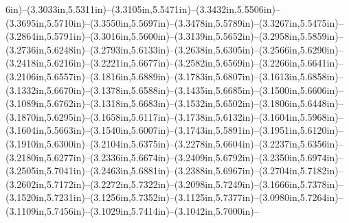 6in)--(3.3033in,5.5311in)--(3.3105in,5.5471in)--(3.3432in,5.5506in)--(3.3695in,5.5710in)--(3.3550in,5.5697in)--(3.3478in,5.5789in)--(3.3267in,5.5475in)--(3.2864in,5.5791in)--(3.3016in,5.5600in)--(3.3139in,5.5652in)--(3.2958in,5.5859in)--(3.2736in,5.6248in)--(3.2793in,5.6133in)--(3.2638in,5.6305in)--(3.2566in,5.6290in)--(3.2418in,5.6216in)--(3.2221in,5.6677in)--(3.2582in,5.6569in)--(3.2266in,5.6641in)--(3.2106in,5.6557in)--(3.1816in,5.6889in)--(3.1783in,5.6807in)--(3.1613in,5.6858in)--(3.1332in,5.6670in)--(3.1378in,5.6588in)--(3.1435in,5.6685in)--(3.1500in,5.6606in)--(3.1089in,5.6762in)--(3.1318in,5.6683in)--(3.1532in,5.6502in)--(3.1806in,5.6448in)--(3.1870in,5.6295in)--(3.1658in,5.6117in)--(3.1738in,5.6132in)--(3.1604in,5.5968in)--(3.1604in,5.5663in)--(3.1540in,5.6007in)--(3.1743in,5.5891in)--(3.1951in,5.6120in)--(3.1910in,5.6300in)--(3.2104in,5.6375in)--(3.2278in,5.6604in)--(3.2237in,5.6356in)--(3.2180in,5.6277in)--(3.2336in,5.6674in)--(3.2409in,5.6792in)--(3.2350in,5.6974in)--(3.2505in,5.7041in)--(3.2463in,5.6881in)--(3.2388in,5.6967in)--(3.2704in,5.7182in)--(3.2602in,5.7172in)--(3.2272in,5.7322in)--(3.2098in,5.7249in)--(3.1666in,5.7378in)--(3.1520in,5.7231in)--(3.1256in,5.7352in)--(3.1125in,5.7377in)--(3.0980in,5.7264in)--(3.1109in,5.7456in)--(3.1029in,5.7414in)--(3.1042in,5.7000in)--
